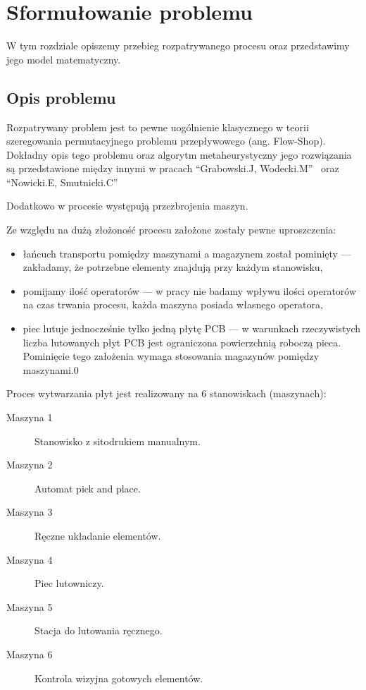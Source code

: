 \chapter{Sformułowanie problemu}
W tym rozdziale opiszemy przebieg rozpatrywanego procesu oraz przedstawimy jego model matematyczny.



\section{Opis problemu}
Rozpatrywany problem jest to pewne uogólnienie klasycznego w teorii szeregowania permutacyjnego problemu przepływowego (ang. Flow-Shop). Dokładny opis tego problemu oraz algorytm metaheurystyczny jego rozwiązania są przedstawione między innymi w pracach ``Grabowski.J, Wodecki.M''~\cite{GRABOWSKI20041891} oraz ``Nowicki.E, Smutnicki.C''~\cite{NOWICKI1996160}

Dodatkowo w procesie występują przezbrojenia maszyn.

\breakparagraph{}
Ze względu na dużą złożoność procesu założone zostały pewne uproszczenia:
\begin{itemize}
	\item łańcuch transportu pomiędzy maszynami a magazynem został pominięty --- zakładamy, że potrzebne elementy znajdują przy każdym stanowisku,
	\item pomijamy ilość operatorów --- w pracy nie badamy wpływu ilości operatorów na czas trwania procesu, każda maszyna posiada własnego operatora,
	\item piec lutuje jednocześnie tylko jedną płytę PCB --- w warunkach rzeczywistych liczba lutowanych płyt PCB jest ograniczona powierzchnią roboczą pieca. Pominięcie tego założenia wymaga stosowania magazynów pomiędzy maszynami.0
\end{itemize}

\breakparagraph{}
Proces wytwarzania płyt jest realizowany na 6 stanowiskach (maszynach):
\begin{description}
	\item[Maszyna 1] Stanowisko z sitodrukiem manualnym.
	\item[Maszyna 2] Automat pick and place.
	\item[Maszyna 3] Ręczne układanie elementów.
	\item[Maszyna 4] Piec lutowniczy.
	\item[Maszyna 5] Stacja do lutowania ręcznego.
	\item[Maszyna 6] Kontrola wizyjna gotowych elementów.
\end{description}

